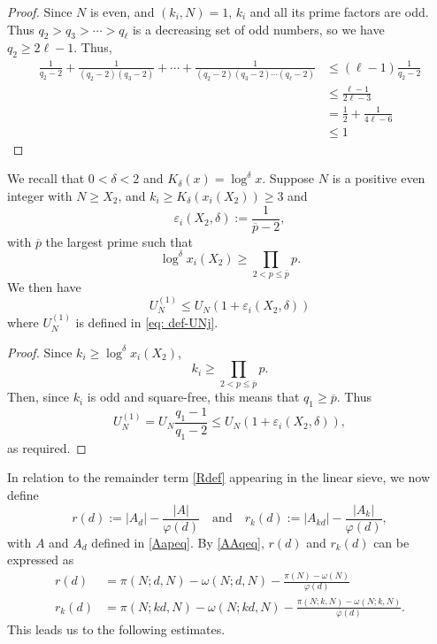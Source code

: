 \documentclass[12pt]{amsart}
\begin{document}
\begin{proof}
    Since $N$ is even, and $(k_i, N) = 1$, $k_i$ and all its prime factors are odd. Thus $q_2>q_3>\cdots>q_{\ell}$ is a decreasing set of odd numbers, so we have $q_2\ge 2\ell-1$. Thus,
    \begin{align*}
        \frac{1}{q_2-2}+\frac{1}{(q_2-2)(q_3-2)}+\cdots+\frac{1}{(q_2-2)(q_3-2)\cdots(q_\ell-2)}&\le(\ell-1)\frac{1}{q_2-2}\\
        &\le\frac{\ell-1}{2\ell-3}\\
        &=\frac{1}{2}+\frac{1}{4\ell-6}\\
        &\le 1
    \end{align*}
\end{proof}
\begin{lemma}\label{e0lem}
We recall that $0 < \delta < 2$ and $K_{\delta}(x) = \log^\delta x$. Suppose $N$ is a positive even integer with $N \ge X_2$, and $k_i\ge K_{\delta}(x_i(X_2)) \ge 3$ and 
\begin{equation} \label{eq: def-epsilon0-X2-delta}
    \varepsilon_i(X_2,\delta):=\frac{1}{\overline{p}-2},    
\end{equation}
with $\overline{p}$ the largest prime such that
    \begin{equation*}
        \log^{\delta}x_i(X_2)\ge \prod_{2<p\le\overline{p}}p.
    \end{equation*}
    We then have 
    \begin{equation*}
        U_N^{(1)}\le U_N(1+\varepsilon_i(X_2,\delta))
    \end{equation*}
    where $U_N^{(1)}$ is defined in \eqref{eq: def-UNj}.
\end{lemma}
\begin{proof}
    Since $k_i\ge\log^\delta x_i(X_2)$,
    \begin{equation*}
        k_i\ge\prod_{2<p\le\overline p}p.
    \end{equation*}
    Then, since $k_i$ is odd and square-free, this means that $q_1\ge\overline{p}$. Thus
    \begin{equation*}
        U_N^{(1)} =  U_N\frac{q_1-1}{q_1-2}\le U_N(1+\varepsilon_i(X_2,\delta)),
    \end{equation*}
    as required.
\end{proof}
In relation to the remainder term \eqref{Rdef} appearing in the linear sieve, we now define
\begin{equation} \label{eq: def-r(d)-rk(d)}
r(d):=\left|A_d\right|-\frac{\left|A\right|}{\varphi(d)}\quad \text{and}\quad
r_k(d):=\left|A_{kd}\right|-\frac{\left|A_k\right|}{\varphi(d)},
\end{equation}
with $A$ and $A_d$ defined in \eqref{Aapeq}. By \eqref{AAqeq}, $r(d)$ and $r_k(d)$ can be expressed as
\begin{align}
    r(d)&=\pi(N;d,N)-\omega(N;d,N)-\frac{\pi(N)-\omega(N)}{\varphi(d)}\label{rddef}\\
    r_k(d)&=\pi(N;kd,N)-\omega(N;kd,N)-\frac{\pi(N;k,N)-\omega(N;k,N)}{\varphi(d)}\label{rkddef}.
\end{align}
This leads us to the following estimates.
\end{document}
